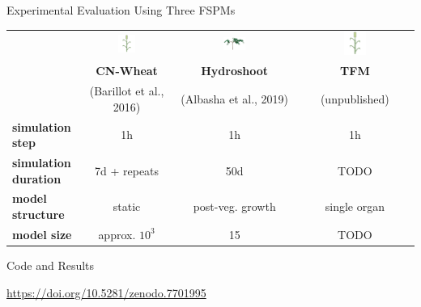 \documentclass[final,aspectratio=169,12pt]{beamer}
\begin{document}
\begin{frame}{Experimental Evaluation Using Three FSPMs}

\centering
\begin{tabular}{lccc}
 & \includegraphics[width=0.2\textwidth]{figures/cnwheat} & \includegraphics[width=0.2\textwidth]{figures/hydroshoot} & \includegraphics[width=0.2\textwidth]{figures/cnwheat} \\
 & \textbf{CN-Wheat} & \textbf{Hydroshoot} & \textbf{TFM} \\
 & {\footnotesize (Barillot et al., 2016)} & {\footnotesize (Albasha et al., 2019)} & {\footnotesize (unpublished)} \\
\textbf{simulation step} & 1h & 1h & 1h \\
\textbf{simulation duration} & 7d + repeats & 50d & TODO \\
\textbf{model structure} & static & post-veg. growth & single organ \\
\textbf{model size} & approx. $10^3$ & 15 & TODO \\
\end{tabular}

\end{frame}

\begin{frame}{Code and Results}

\url{https://doi.org/10.5281/zenodo.7701995}
	
\end{frame}
\end{document}
